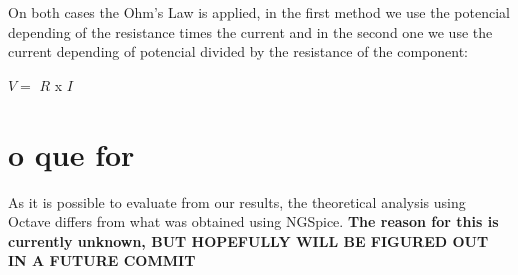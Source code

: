 On both cases the Ohm's Law is applied, in the first method we use the potencial depending of the resistance times the current and in the second one we use the current depending of potencial divided by the resistance of the component: 

\vspace{1cm}

$V =$  $R$ x $I$ 
\vspace{1cm} 






\section{o que for}

As it is possible to evaluate from our results, the theoretical analysis using Octave differs from what was obtained using NGSpice. \textbf{The reason for this is currently unknown, BUT HOPEFULLY WILL BE FIGURED OUT IN A FUTURE COMMIT}
